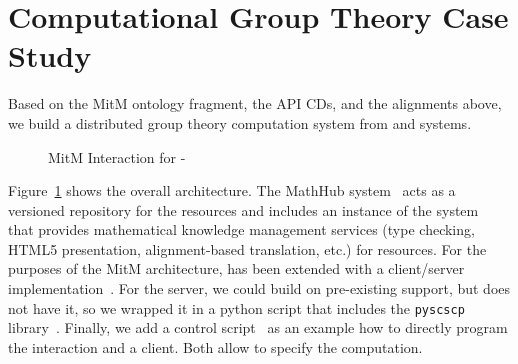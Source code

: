 \section{Computational Group Theory Case Study}\label{sec:case}
Based on the MitM ontology fragment, the API CDs, and the alignments above, we build a
distributed group theory computation system from \GAP and \Singular
systems.

\begin{figure}[ht]\centering
  \caption{MitM Interaction for \GAP-\Singular}\label{fig:mitmpoc}
\end{figure}

Figure~\ref{fig:mitmpoc} shows the overall architecture. The MathHub
system~\cite{IanJucKoh:sdm14,MathHub:on} acts as a versioned repository for the \OMMT
resources and includes an instance of the \MMT system~\cite{Rabe:MAGMS13} that provides
mathematical knowledge management services (type checking, HTML5 presentation,
alignment-based translation, etc.) for \OMMT resources. For the purposes of the MitM
architecture, \MMT has been extended with a \SCSCP client/server
implementation~\cite{twiesing:msc17}. For the \GAP server, we could build on pre-existing
\SCSCP support, but \Singular does not have it, so we wrapped it in a python script that
includes the \lstinline|pyscscp| library~\cite{py-scscp:on}. Finally, we add a \Python
control script~\cite{MitM-PoC} as an example how to directly program the interaction and a
\Sage client. Both allow to specify the computation.

